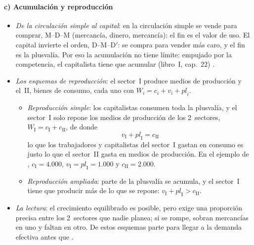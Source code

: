 \documentclass[11pt]{article}
\begin{document}
\paragraph{c) Acumulación y reproducción}
\begin{itemize}
\item \emph{De la circulación simple al capital}: en la circulación simple se vende para comprar, M--D--M (mercancía, dinero, mercancía): el fin es el valor de uso. El capital invierte el orden, D--M--D$'$: se compra para vender más caro, y el fin es la plusvalía\nocite{Marx1867Kapital}. Por eso la acumulación no tiene límite: empujado por la competencia, el capitalista tiene que acumular (libro~I, cap.~22) .
\item \emph{Los esquemas de reproducción}\nocite{Marx1885Kapital}: el sector~I produce medios de producción y el~II, bienes de consumo, cada uno con $W_i=c_i+v_i+\mathit{pl}_i$.
  \begin{itemize}
  \item \emph{Reproducción simple}: los capitalistas consumen toda la plusvalía, y el sector~I solo repone los medios de producción de los 2~sectores, $W_{\mathrm I}=c_{\mathrm I}+c_{\mathrm{II}}$, de donde
  \begin{equation}\label{eq:reproduccion-simple}
  v_{\mathrm I}+\mathit{pl}_{\mathrm I}=c_{\mathrm{II}}
  \end{equation}
  lo que los trabajadores y capitalistas del sector~I gastan en consumo es justo lo que el sector~II gasta en medios de producción. En el ejemplo de , $c_{\mathrm I}=4.000$, $v_{\mathrm I}=\mathit{pl}_{\mathrm I}=1.000$ y $c_{\mathrm{II}}=2.000$.
  \item \emph{Reproducción ampliada}: parte de la plusvalía se acumula, y el sector~I tiene que producir más de lo que se repone: $v_{\mathrm I}+\mathit{pl}_{\mathrm I}>c_{\mathrm{II}}$.
  \end{itemize}
\item \emph{La lectura}: el crecimiento equilibrado es posible, pero exige una proporción precisa entre los 2~sectores que nadie planea; si se rompe, sobran mercancías en uno y faltan en otro. De estos esquemas parte  para llegar a la demanda efectiva antes que \nocite{Kalecki1933Proba} .
\end{itemize}
\end{document}
